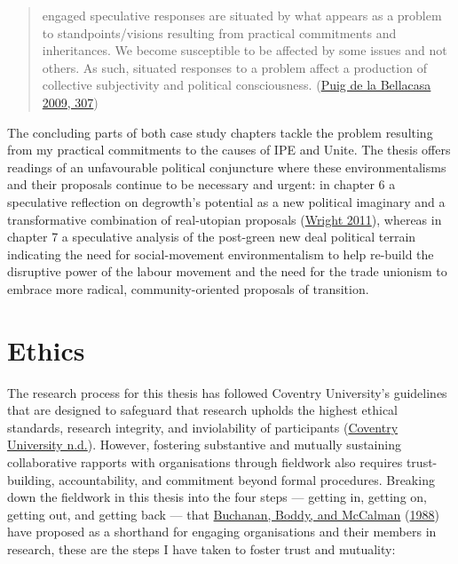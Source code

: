 \documentclass[a4paper, nobind]{templates/ociamthesis}
\begin{document}
\begin{quote}
engaged speculative responses are situated by what appears as a problem to standpoints/visions resulting from practical commitments and inheritances. We become susceptible to be affected by some issues and not others. As such, situated responses to a problem affect a production of collective subjectivity and political consciousness. (\protect\hyperlink{ref-puig_de_la_bellacasa_touching_2009}{Puig de la Bellacasa 2009, 307})
\end{quote}

The concluding parts of both case study chapters tackle the problem resulting from my practical commitments to the causes of IPE and Unite. The thesis offers readings of an unfavourable political conjuncture where these environmentalisms and their proposals continue to be necessary and urgent: in chapter 6 a speculative reflection on degrowth's potential as a new political imaginary and a transformative combination of real-utopian proposals (\protect\hyperlink{ref-wright_real_2011}{Wright 2011}), whereas in chapter 7 a speculative analysis of the post-green new deal political terrain indicating the need for social-movement environmentalism to help re-build the disruptive power of the labour movement and the need for the trade unionism to embrace more radical, community-oriented proposals of transition.

\hypertarget{ethics}{%
\section{Ethics}\label{ethics}}

The research process for this thesis has followed Coventry University's guidelines that are designed to safeguard that research upholds the highest ethical standards, research integrity, and inviolability of participants (\protect\hyperlink{ref-coventry_university_research_}{Coventry University n.d.}). However, fostering substantive and mutually sustaining collaborative rapports with organisations through fieldwork also requires trust-building, accountability, and commitment beyond formal procedures. Breaking down the fieldwork in this thesis into the four steps --- getting in, getting on, getting out, and getting back --- that \protect\hyperlink{ref-buchanan_getting_1988}{Buchanan, Boddy, and McCalman} (\protect\hyperlink{ref-buchanan_getting_1988}{1988}) have proposed as a shorthand for engaging organisations and their members in research, these are the steps I have taken to foster trust and mutuality:
\end{document}
